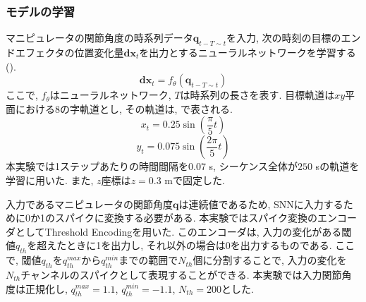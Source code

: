 \subsubsection{モデルの学習}
マニピュレータの関節角度の時系列データ$\bm{q}_{t-T \sim t}$を入力, 次の時刻の目標のエンドエフェクタの位置変化量$\bm{dx}_{t}$を出力とするニューラルネットワークを学習する ().
\begin{equation}
    \bm{dx}_{t} = f_{\theta}(\bm{q}_{t-T \sim t}) \label{eq:model:learning}
\end{equation}
ここで, $f_{\theta}$はニューラルネットワーク, $T$は時系列の長さを表す.
目標軌道は$xy$平面における8の字軌道とし, その軌道は, で表される.
\begin{equation}
    x_t=0.25 \sin (\frac{\pi}{5} t) \label{eq:model:target_trajectoryx}
\end{equation}
\begin{equation}
    y_t=0.075 \sin (\frac{2\pi}{5} t) \label{eq:model:target_trajectoryy}
\end{equation}
本実験では1ステップあたりの時間間隔を$0.07$ s, シーケンス全体が$250$ sの軌道を学習に用いた.
また, $z$座標は$z=0.3$ mで固定した.

入力であるマニピュレータの関節角度$\bm{q}$は連続値であるため, SNNに入力するために0か1のスパイクに変換する必要がある.
本実験ではスパイク変換のエンコーダとしてThreshold Encodingを用いた.
このエンコーダは, 入力の変化がある閾値$q_{th}$を超えたときに1を出力し, それ以外の場合は0を出力するものである.
ここで, 閾値$q_{th}$を$q_{th}^{max}$から$q_{th}^{min}$までの範囲で$N_{th}$個に分割することで, 入力の変化を$N_{th}$チャンネルのスパイクとして表現することができる.
本実験では入力関節角度は正規化し, $q_{th}^{max}=1.1$, $q_{th}^{min}=-1.1$, $N_{th}=200$とした.

